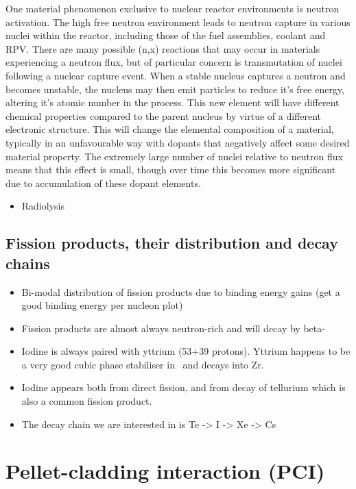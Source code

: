 One material phenomenon exclusive to nuclear reactor environments is neutron activation. The high free neutron environment leads to neutron capture in various nuclei within the reactor, including those of the fuel assemblies, coolant and RPV. There are many possible (n,x) reactions that may occur in materials experiencing a neutron flux, but of particular concern is transmutation of nuclei following a nuclear capture event. When a stable nucleus captures a neutron and becomes unstable, the nucleus may then emit particles to reduce it's free energy, altering it's atomic number in the process. This new element will have different chemical properties compared to the parent nucleus by virtue of a different electronic structure. This will change the elemental composition of a material, typically in an unfavourable way with dopants that negatively affect some desired material property. The extremely large number of nuclei relative to neutron flux means that this effect is small, though over time this becomes more significant due to accumulation of these dopant elements.

\begin{itemize}
\item Radiolysis
\end{itemize}

\subsection{Fission products, their distribution and decay chains}

\begin{itemize}
\item Bi-modal distribution of fission products due to binding energy gains (get a good binding energy per nucleon plot)
\item Fission products are almost always neutron-rich and will decay by beta-
\item Iodine is always paired with yttrium (53+39 protons). Yttrium happens to be a very good cubic phase stabiliser in \zirconia\ and decays into Zr.
\item Iodine appears both from direct fission, and from decay of tellurium which is also a common fission product.
\item The decay chain we are interested in is Te -> I -> Xe -> Cs
\end{itemize}

\section{Pellet-cladding interaction (PCI)}

